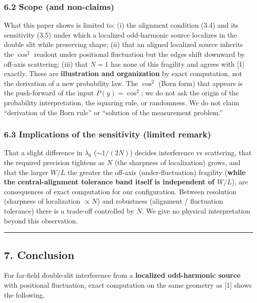 \documentclass[
]{article}
\newcounter{none} %
\begin{document}
\subsubsection{6.2 Scope (and non-claims)}\label{scope-and-non-claims}

What this paper shows is limited to: (i) the alignment condition (3.4)
and its sensitivity (3.5) under which a localized odd-harmonic source
localizes in the double slit while preserving shape; (ii) that an
aligned localized source inherits the \(\cos^2\) readout under
positional fluctuation but the edges shift downward by off-axis
scattering; (iii) that \(N=1\) has none of this fragility and agrees
with {[}1{]} exactly. These are \textbf{illustration and organization}
by exact computation, not the derivation of a new probability law. The
\(\cos^2\) (Born form) that appears is the push-forward of the input
\(P(y)=\cos^2\); we do not ask the origin of the probability
interpretation, the squaring rule, or randomness. We do not claim
``derivation of the Born rule'' or ``solution of the measurement
problem.''

\subsubsection{6.3 Implications of the sensitivity (limited
remark)}\label{implications-of-the-sensitivity-limited-remark}

That a slight difference in \(\lambda_0\) (\(\sim 1/(2N)\)) decides
interference vs scattering, that the required precision tightens as
\(N\) (the sharpness of localization) grows, and that the larger \(W/L\)
the greater the off-axis (under-fluctuation) fragility (\textbf{while
the central-alignment tolerance band itself is independent of \(W/L\)}),
are consequences of exact computation for our configuration. Between
resolution (sharpness of localization \(\propto N\)) and robustness
(alignment / fluctuation tolerance) there is a trade-off controlled by
\(N\). We give no physical interpretation beyond this observation.

\begin{center}\rule{0.5\linewidth}{0.5pt}\end{center}

\subsection{7. Conclusion}\label{conclusion}

For far-field double-slit interference from a \textbf{localized
odd-harmonic source} with positional fluctuation, exact computation on
the same geometry as {[}1{]} shows the following.
\end{document}
